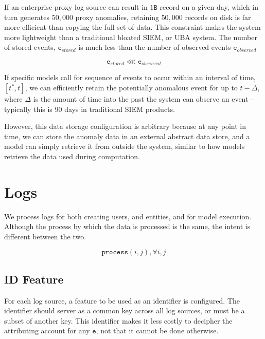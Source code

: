 \documentclass[10pt, titlepage, twocolumn]{article}
\begin{document}
If an enterprise proxy log source can result in \(1\texttt{B}\) record on a given day, which in turn generates \(50,000\) proxy anomalies, retaining \(50,000\) records on disk is far more efficient than copying the full set of data. This constraint makes the system more lightweight than a traditional bloated SIEM, or UBA system. The number of stored events, \(\texttt{e}_{stored}\) is much less than the number of observed events \(\texttt{e}_{observed}\)

\begin{equation}
\texttt{e}_{stored} \lll \texttt{e}_{observed}
\end{equation}

If specific models call for sequence of events to occur within an interval of time, \([t^*,t]\), we can efficiently retain the potentially anomalous event for up to \(t - \Delta\), where \(\Delta\) is the amount of time into the past the system can observe an event -- typically this is 90 days in traditional SIEM products. 

However, this data storage configuration is arbitrary because at any point in time, we can store the anomaly data in an external abstract data store, and a model can simply retrieve it from outside the system, similar to how models retrieve the data used during computation.






\section{Logs}
We process logs for both creating users, and entities, and for model execution. Although the process by which the data is processed is the same, the intent is different between the two.

\begin{equation}
\texttt{process}(i, j), \forall i,j 
\end{equation}

\subsection{ID Feature}
For each log source, a feature to be used as an identifier is configured. The identifier should server as a common key across all log sources, or must be a subset of another key. This identifier makes it less costly to decipher the attributing account for any \(\texttt{e}\), not that it cannot be done otherwise.
\end{document}

